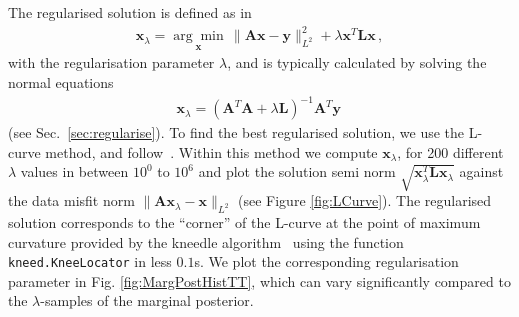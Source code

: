 The regularised solution is defined as in~\cite{hansen2010discrete, fox2016fast} 
\begin{align}
	\bm{x}_{\lambda} =\underset{ \bm{x}}{\arg \min}\,  \lVert \bm{A}\bm{x} - \bm{y} \rVert_{L^2}^2 + \lambda \bm{x}^T \bm{L} \bm{x} \, ,
	\label{eq:XLam}
\end{align}
with the regularisation parameter $\lambda$,
and is typically calculated by solving the normal equations
\begin{align}
	\bm{x}_{\lambda} = (\bm{A}^T\bm{A} + \lambda \bm{L} )^{-1} \bm{A}^T \bm{y} \label{eq:xLam} \, 
\end{align}
(see Sec.~\ref{sec:regularise}).
To find the best regularised solution, we use the L-curve method, and follow~\cite{hansen1993use}.
Within this method we compute $\bm{x}_\lambda$, for 200 different $\lambda$ values in between $10^{0}$ to $10^{6}$ and plot the solution semi norm $\sqrt{\bm{x}_\lambda^T\mathbf{L} \bm{x}_\lambda}$ against the data misfit norm $\lVert \bm{A}\bm{x}_\lambda - \bm{x} \rVert_{L^2}$ (see Figure \ref{fig:LCurve}). 
The regularised solution corresponds to the ``corner'' of the L-curve at the point of maximum curvature provided by the kneedle algorithm~\cite{satopaa2011kneedle} using the function \texttt{kneed.KneeLocator} in less $0.1$s.
We plot the corresponding regularisation parameter in Fig. \ref{fig:MargPostHistTT}, which can vary significantly compared to the $\lambda$-samples of the marginal posterior.
